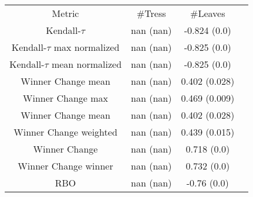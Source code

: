 \begin{tabular}{c|c|c|c} 
Metric & #Tress & #Leaves \\ 
Kendall-$\tau$ & nan (nan) & -0.824 (0.0)   \\ 
Kendall-$\tau$ max normalized & nan (nan) & -0.825 (0.0)   \\ 
Kendall-$\tau$ mean normalized & nan (nan) & -0.825 (0.0)   \\ 
Winner Change mean& nan (nan) & 0.402 (0.028)   \\ 
Winner Change max & nan (nan) & 0.469 (0.009)   \\ 
Winner Change mean & nan (nan) & 0.402 (0.028)   \\ 
Winner Change weighted & nan (nan) & 0.439 (0.015)   \\ 
Winner Change & nan (nan) & 0.718 (0.0)   \\ 
Winner Change winner & nan (nan) & 0.732 (0.0)   \\ 
RBO & nan (nan) & -0.76 (0.0)   \\ 
\end{tabular}